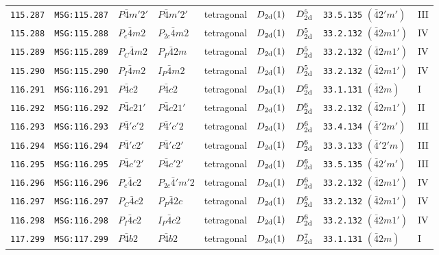 \documentclass[fleqn,10pt]{jsarticle}
\begin{document}
\begin{center}
\begin{longtable}{lllllllll}
\texttt{115.287} & \texttt{MSG:115.287} & $P\bar{4}m'2'$ & $P\bar{4}m'2'$ & tetragonal & $D_{\rm 2d}(1)$ & $D_{\rm 2d}^{5}$ & \texttt{33.5.135} $(\bar{4}2'm')$ & III \\
\texttt{115.288} & \texttt{MSG:115.288} & $P_{c}\bar{4}m2$ & $P_{2c}\bar{4}m2$ & tetragonal & $D_{\rm 2d}(1)$ & $D_{\rm 2d}^{5}$ & \texttt{33.2.132} $(\bar{4}2m1')$ & IV \\
\texttt{115.289} & \texttt{MSG:115.289} & $P_{C}\bar{4}m2$ & $P_{P}\bar{4}2m$ & tetragonal & $D_{\rm 2d}(1)$ & $D_{\rm 2d}^{5}$ & \texttt{33.2.132} $(\bar{4}2m1')$ & IV \\
\texttt{115.290} & \texttt{MSG:115.290} & $P_{I}\bar{4}m2$ & $I_{P}\bar{4}m2$ & tetragonal & $D_{\rm 2d}(1)$ & $D_{\rm 2d}^{5}$ & \texttt{33.2.132} $(\bar{4}2m1')$ & IV \\ \hline
\texttt{116.291} & \texttt{MSG:116.291} & $P\bar{4}c2$ & $P\bar{4}c2$ & tetragonal & $D_{\rm 2d}(1)$ & $D_{\rm 2d}^{6}$ & \texttt{33.1.131} $(\bar{4}2m)$ & I \\
\texttt{116.292} & \texttt{MSG:116.292} & $P\bar{4}c21'$ & $P\bar{4}c21'$ & tetragonal & $D_{\rm 2d}(1)$ & $D_{\rm 2d}^{6}$ & \texttt{33.2.132} $(\bar{4}2m1')$ & II \\
\texttt{116.293} & \texttt{MSG:116.293} & $P\bar{4}'c'2$ & $P\bar{4}'c'2$ & tetragonal & $D_{\rm 2d}(1)$ & $D_{\rm 2d}^{6}$ & \texttt{33.4.134} $(\bar{4}'2m')$ & III \\
\texttt{116.294} & \texttt{MSG:116.294} & $P\bar{4}'c2'$ & $P\bar{4}'c2'$ & tetragonal & $D_{\rm 2d}(1)$ & $D_{\rm 2d}^{6}$ & \texttt{33.3.133} $(\bar{4}'2'm)$ & III \\
\texttt{116.295} & \texttt{MSG:116.295} & $P\bar{4}c'2'$ & $P\bar{4}c'2'$ & tetragonal & $D_{\rm 2d}(1)$ & $D_{\rm 2d}^{6}$ & \texttt{33.5.135} $(\bar{4}2'm')$ & III \\
\texttt{116.296} & \texttt{MSG:116.296} & $P_{c}\bar{4}c2$ & $P_{2c}\bar{4}'m'2$ & tetragonal & $D_{\rm 2d}(1)$ & $D_{\rm 2d}^{6}$ & \texttt{33.2.132} $(\bar{4}2m1')$ & IV \\
\texttt{116.297} & \texttt{MSG:116.297} & $P_{C}\bar{4}c2$ & $P_{P}\bar{4}2c$ & tetragonal & $D_{\rm 2d}(1)$ & $D_{\rm 2d}^{6}$ & \texttt{33.2.132} $(\bar{4}2m1')$ & IV \\
\texttt{116.298} & \texttt{MSG:116.298} & $P_{I}\bar{4}c2$ & $I_{P}\bar{4}c2$ & tetragonal & $D_{\rm 2d}(1)$ & $D_{\rm 2d}^{6}$ & \texttt{33.2.132} $(\bar{4}2m1')$ & IV \\ \hline
\texttt{117.299} & \texttt{MSG:117.299} & $P\bar{4}b2$ & $P\bar{4}b2$ & tetragonal & $D_{\rm 2d}(1)$ & $D_{\rm 2d}^{7}$ & \texttt{33.1.131} $(\bar{4}2m)$ & I \\

\end{longtable}
\end{center}
\end{document}
